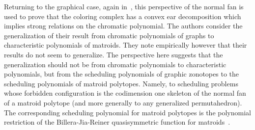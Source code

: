 \documentclass[12pt,reqno]{amsart}
\numberwithin{definition}{section}
\newtheorem{theorem}[definition]{Theorem}
\theoremstyle{definition}
\newtheorem{example}[definition]{Example}
\newcommand{\SSS}{\mathcal{S}}
\newcommand{\ncL}{\mathcal{L}}
\begin{document}
Returning to the graphical case, again in~\cite{HS}, this perspective of the normal fan is used to prove that the coloring
complex has a convex ear decomposition which implies strong relations on
the chromatic polynomial. The authors consider the generalization of their result from chromatic polynomials of graphs to characteristic polynomials of matroids.
 They note empirically
however that their results do not seem to generalize.  The perspective
here suggests that the generalization should not be from chromatic
polynomials to characteristic polynomials, but from the scheduling
polynomials of graphic zonotopes to the scheduling polynomials of
matroid polytopes.  Namely, to scheduling problems whose forbidden
configuration is the codimension one skeleton of the normal fan of a
matroid polytope  (and more generally to any generalized permutahedron).  The corresponding scheduling polynomial for matroid polytopes is the
polynomial restriction of the Billera-Jia-Reiner quasisymmetric
function for matroids~\cite{BJR}.



\end{document}
